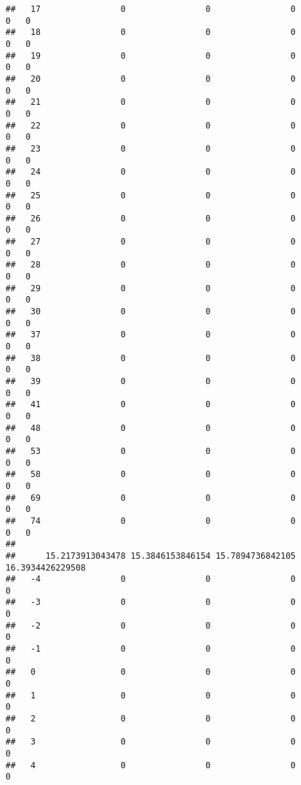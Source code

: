 \documentclass[]{article}
\begin{document}
\begin{verbatim}
##   17                0                0                0                0   0
##   18                0                0                0                0   0
##   19                0                0                0                0   0
##   20                0                0                0                0   0
##   21                0                0                0                0   0
##   22                0                0                0                0   0
##   23                0                0                0                0   0
##   24                0                0                0                0   0
##   25                0                0                0                0   0
##   26                0                0                0                0   0
##   27                0                0                0                0   0
##   28                0                0                0                0   0
##   29                0                0                0                0   0
##   30                0                0                0                0   0
##   37                0                0                0                0   0
##   38                0                0                0                0   0
##   39                0                0                0                0   0
##   41                0                0                0                0   0
##   48                0                0                0                0   0
##   53                0                0                0                0   0
##   58                0                0                0                0   0
##   69                0                0                0                0   0
##   74                0                0                0                0   0
##     
##      15.2173913043478 15.3846153846154 15.7894736842105 16.3934426229508
##   -4                0                0                0                0
##   -3                0                0                0                0
##   -2                0                0                0                0
##   -1                0                0                0                0
##   0                 0                0                0                0
##   1                 0                0                0                0
##   2                 0                0                0                0
##   3                 0                0                0                0
##   4                 0                0                0                0

\end{verbatim}
\end{document}
